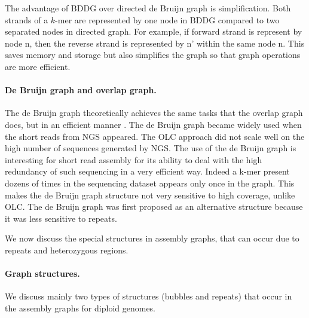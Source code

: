 The  advantage  of  BDDG  over  directed  de Bruijn  graph  is  simplification.  Both  strands  of  a  $k$-mer  are  
represented   by   one   node   in   BDDG   compared   to   two   
separated  nodes  in  directed  graph.  For example, if forward strand is represent by node n, then the reverse strand is represented by n' within the same node n.
This saves memory and storage but also simplifies the graph so that graph operations are more efficient.

\paragraph{De Bruijn graph and overlap graph.}
The de Bruijn graph theoretically achieves
the same tasks that the overlap graph does, but in an efficient manner \citep{li2012comparison}.
The de Bruijn graph became widely used when the short reads from NGS appeared. The OLC
approach did not scale well on the high number of sequences generated by NGS. The
use of the de Bruijn graph is interesting for short read assembly for its ability to
deal with the high redundancy of such sequencing in a very efficient way. Indeed a k-mer
present dozens of times in the sequencing dataset appears only once in the graph. This
makes the de Bruijn graph structure not very sensitive to high coverage, unlike
OLC. The de Bruijn graph was first proposed as an alternative structure \citep{pevzner2001eulerian} because it
was less sensitive to repeats. 

We now discuss the special structures in assembly graphs, that can occur due to repeats and heterozygous regions.

\paragraph{Graph structures.} We discuss mainly two types of structures (bubbles and repeats) that occur in the assembly graphs for diploid genomes.

